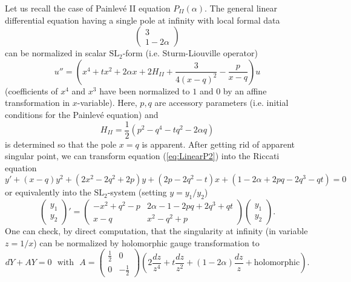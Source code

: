 \documentclass[12]{amsart}
\newcommand{\SL}{\mathrm{SL}_2}
\begin{document}
Let us recall the case of Painlev\'e II equation $P_{II}(\alpha)$. The general linear differential equation
having a single pole at infinity with local formal data
$$\begin{pmatrix}3\\ 1-2\alpha\end{pmatrix}$$
can be normalized in scalar $\SL$-form (i.e. Sturm-Liouville operator)
\begin{equation}\label{eq:LinearP2}
u''=\left(x^4+tx^2+2\alpha x+2H_{II}+\frac{3}{4(x-q)^2}-\frac{p}{x-q}\right)u
\end{equation}
(coefficients of $x^4$ and $x^3$ have been normalized to $1$ and $0$ by an affine transformation in $x$-variable).
Here, $p,q$ are accessory parameters (i.e. initial conditions for the Painlev\'e equation) and 
\begin{equation}\label{eq:HamiltonianP2}
H_{II}=\frac{1}{2}\left(p^2-q^4-tq^2-2\alpha q\right)
\end{equation}
is determined so that the pole $x=q$ is apparent. After getting rid of apparent singular point, we can transform equation (\ref{eq:LinearP2}) into the Riccati equation 
\begin{equation}\label{eq:RiccatiP2}
y'+(x-q)y^2+(2x^2-2q^2+2p)y+(2p-2q^2-t)x+(1-2\alpha+2pq-2q^3-qt)=0
\end{equation}
or equivalently into the $\SL$-system (setting $y=y_1/y_2$)
\begin{equation}\label{eq:SystemP2}
\begin{pmatrix}y_1\\ y_2\end{pmatrix}'=\begin{pmatrix}-x^2+q^2-p & 2\alpha-1-2pq+2q^3+qt\\ x-q & x^2-q^2+p\end{pmatrix}\begin{pmatrix}y_1\\ y_2\end{pmatrix}.
\end{equation}
One can check, by direct computation, that the singularity at infinity (in  variable $z=1/x$) can be 
normalized by holomorphic gauge transformation to 
\begin{equation}\label{eq:SystemP2infty}
dY+AY=0\ \ \ \text{with}\ \ \ 
A=\begin{pmatrix}\frac{1}{2}&0\\ 0 & -\frac{1}{2}\end{pmatrix}\left(2\frac{dz}{z^4}+t\frac{dz}{z^2}+\left(1-2\alpha\right)\frac{dz}{z}+\text{holomorphic}\right).
\end{equation}
\end{document}
